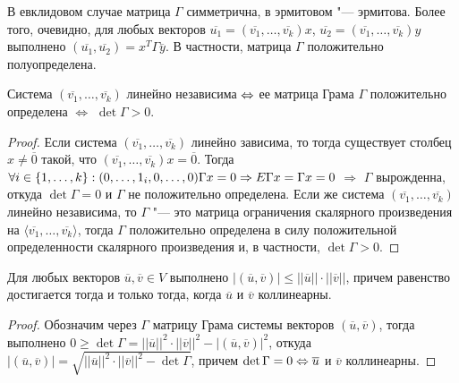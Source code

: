\begin{note}
	В евклидовом случае матрица $\Gamma$ симметрична, в эрмитовом "--- эрмитова. Более того, очевидно, для любых векторов $\overline{u_1} = (\overline{v_1}, \dots, \overline{v_k})x$, $\overline{u_2} = (\overline{v_1}, \dots, \overline{v_k})y$ выполнено $(\overline{u_1}, \overline{u_2}) = x^T\Gamma \overline{y}$. В частности, матрица $\Gamma$ положительно полуопределена.
\end{note}

\begin{theorem}
	Система $(\overline{v_1}, \dots, \overline{v_k})$ линейно независима $\Leftrightarrow$ ее матрица Грама $\Gamma$ положительно определена $\Leftrightarrow$ $\det{\Gamma} > 0$.
\end{theorem}

\begin{proof}
	Если система $(\overline{v_1}, \dots, \overline{v_k})$ линейно зависима, то тогда существует столбец $x \ne \overline0$ такой, что $(\overline{v_1}, \dots, \overline{v_k})x = \overline{0}$. Тогда $\forall i \in \{1, \dots, k\}: (0, \dotsc, 1_i, 0, \dotsc, 0)\Gamma x = 0 \hm\Rightarrow E\Gamma x = \Gamma x = 0$ $\Rightarrow$ $\Gamma$ вырожденна, откуда $\det{\Gamma} = 0$ и $\Gamma$ не положительно определена. Если же система $(\overline{v_1}, \dots, \overline{v_k})$ линейно независима, то $\Gamma$ "--- это матрица ограничения скалярного произведения на $\langle\overline{v_1}, \dots, \overline{v_k}\rangle$, тогда $\Gamma$ положительно определена в силу положительной определенности скалярного произведения и, в частности, $\det{\Gamma} > 0$.
\end{proof}

\begin{theorem}
	Для любых векторов $\overline{u}, \overline{v} \in V$ выполнено $|(\overline{u}, \overline{v})| \le ||\overline{u}||\cdot||\overline{v}||$, причем равенство достигается тогда и только тогда, когда $\overline{u}$ и $\overline{v}$ коллинеарны.
\end{theorem}

\begin{proof}
	Обозначим через $\Gamma$ матрицу Грама системы векторов $(\overline{u}, \overline{v})$, тогда выполнено $0 \ge \det{\Gamma} = ||\overline{u}||^2\cdot||\overline{v}||^2 - |(\overline{u}, \overline{v})|^2$, откуда $|(\overline{u}, \overline{v})| = \sqrt{||\overline{u}||^2\cdot||\overline{v}||^2 - \det{\Gamma}}$, причем $\det{\Gamma} = 0 \Leftrightarrow \overline{u}$ и $\overline{v}$ коллинеарны.
\end{proof}

